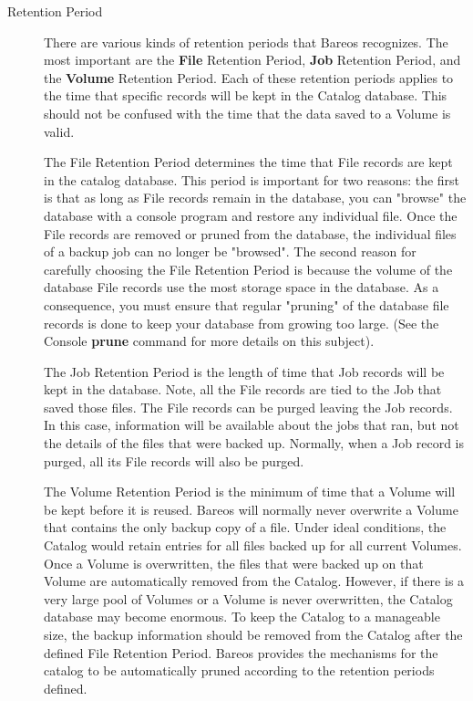 \begin{description}

\item [Retention Period]
   There are various kinds of retention periods that Bareos recognizes.
   The most important are the {\bf File} Retention Period, {\bf Job}
   Retention Period, and the {\bf Volume} Retention Period.  Each of these
   retention periods applies to the time that specific records will be kept
   in the Catalog database.  This should not be confused with the time that
   the data saved to a Volume is valid.

   The File Retention Period determines the time that File records are kept
   in the catalog database.  This period is important for two reasons: the
   first is that as long as File records remain in the database, you
   can "browse" the database with a console program and restore any
   individual file. Once the File records are removed or pruned from the
   database, the individual files of a backup job can no longer be
   "browsed".  The second reason for carefully choosing the File Retention
   Period is because the volume of
   the database File records use the most storage space in the
   database.  As a consequence, you must ensure that regular "pruning" of
   the database file records is done to keep your database from growing
   too large. (See the Console {\bf prune}
   command for more details on this subject).

   The Job Retention Period is the length of time that Job records will be
   kept in the database.  Note, all the File records are tied to the Job
   that saved those files.  The File records can be purged leaving the Job
   records.  In this case, information will be available about the jobs
   that ran, but not the details of the files that were backed up.
   Normally, when a Job record is purged, all its File records will also be
   purged.

   The Volume Retention Period is the minimum of time that a Volume will be
   kept before it is reused.  Bareos will normally never overwrite a Volume
   that contains the only backup copy of a file.  Under ideal conditions,
   the Catalog would retain entries for all files backed up for all current
   Volumes.  Once a Volume is overwritten, the files that were backed up on
   that Volume are automatically removed from the Catalog.  However, if
   there is a very large pool of Volumes or a Volume is never overwritten,
   the Catalog database may become enormous.  To keep the Catalog to a
   manageable size, the backup information should be removed from the
   Catalog after the defined File Retention Period.  Bareos provides the
   mechanisms for the catalog to be automatically pruned according to the
   retention periods defined.


\end{description}
